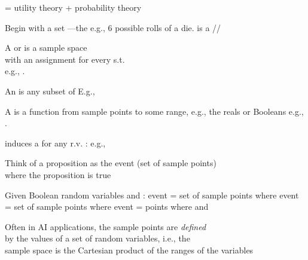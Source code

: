 \documentclass{article}
\begin{document}
\begin{huge}
 = utility theory + probability theory




Begin with a set \mat{$\Omega$}---the \al
e.g., 6 possible rolls of a die.\al
\mat{$\omega\in \Omega$} is a //

A  or  is a sample space\\
with an assignment  for every \mat{$\omega\in\Omega$} s.t.\al
  \al
  \\
e.g., .

An   is any subset of \mat{$\Omega$}
\mat{\[
  P(A) = \mysum_{\{\omega\in A\}} P(\omega)
\]}
E.g., 



A  is a function from sample points
to some range, e.g., the reals or Booleans\al
e.g., .

 induces a  for any r.v. :
\mat{\[
  P(X\eq x_i) = \mysum_{\{\omega: X(\omega)\eq x_i\}} P(\omega)
\]}
e.g., 


Think of a proposition as the event (set of sample points)\\
where the proposition is true

Given Boolean random variables  and :\al
  event  = set of sample points where \al
  event  = set of sample points where \al
  event  = points where  and 

Often in AI applications, the sample points are \emph{defined}\\
by the values of a set of random variables, i.e., the\\
sample space is the Cartesian product of the ranges of the variables


\end{huge}
\end{document}
